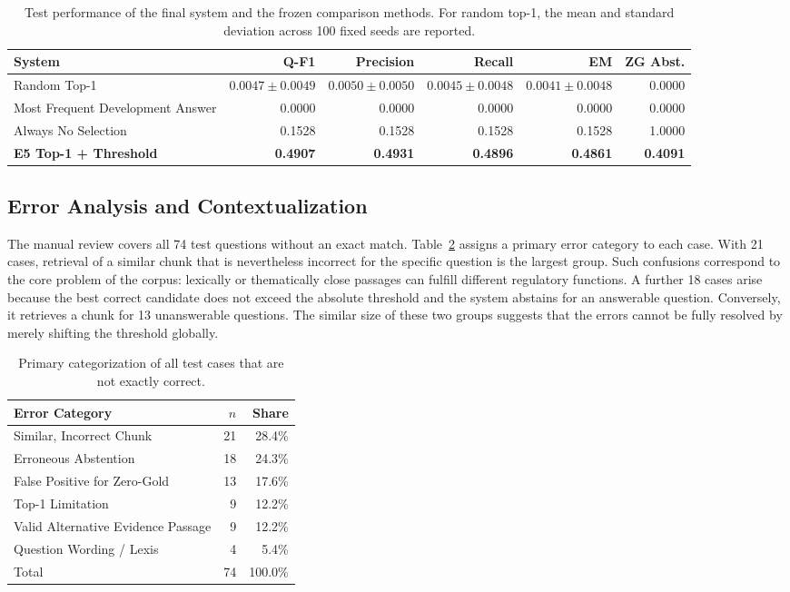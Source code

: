 \documentclass[11pt]{article}
\begin{document}
\begin{table}[t]
\centering
\small
\begin{tabular}{lrrrrr}
\toprule
\textbf{System} & \textbf{Q-F1} & \textbf{Precision} & \textbf{Recall} & \textbf{EM} & \textbf{ZG Abst.} \\
\midrule
Random Top-1 & $0.0047\pm0.0049$ & $0.0050\pm0.0050$ & $0.0045\pm0.0048$ & $0.0041\pm0.0048$ & 0.0000 \\
Most Frequent Development Answer & 0.0000 & 0.0000 & 0.0000 & 0.0000 & 0.0000 \\
Always No Selection & 0.1528 & 0.1528 & 0.1528 & 0.1528 & 1.0000 \\
\textbf{E5 Top-1 + Threshold} & \textbf{0.4907} & \textbf{0.4931} & \textbf{0.4896} & \textbf{0.4861} & \textbf{0.4091} \\
\bottomrule
\end{tabular}
\caption{Test performance of the final system and the frozen comparison methods. For random top-1, the mean and standard deviation across 100 fixed seeds are reported.}
\label{tab:baselines}
\end{table}

\subsection{Error Analysis and Contextualization}

The manual review covers all 74 test questions without an exact match. Table~\ref{tab:error-analysis} assigns a primary error category to each case. With 21 cases, retrieval of a similar chunk that is nevertheless incorrect for the specific question is the largest group. Such confusions correspond to the core problem of the corpus: lexically or thematically close passages can fulfill different regulatory functions. A further 18 cases arise because the best correct candidate does not exceed the absolute threshold and the system abstains for an answerable question. Conversely, it retrieves a chunk for 13 unanswerable questions. The similar size of these two groups suggests that the errors cannot be fully resolved by merely shifting the threshold globally.

\begin{table}[t]
\centering
\small
\begin{tabular}{lrr}
\toprule
\textbf{Error Category} & \textbf{$n$} & \textbf{Share} \\
\midrule
Similar, Incorrect Chunk & 21 & 28.4\% \\
Erroneous Abstention & 18 & 24.3\% \\
False Positive for Zero-Gold & 13 & 17.6\% \\
Top-1 Limitation & 9 & 12.2\% \\
Valid Alternative Evidence Passage & 9 & 12.2\% \\
Question Wording / Lexis & 4 & 5.4\% \\
\midrule
Total & 74 & 100.0\% \\
\bottomrule
\end{tabular}
\caption{Primary categorization of all test cases that are not exactly correct.}
\label{tab:error-analysis}
\end{table}
\end{document}
